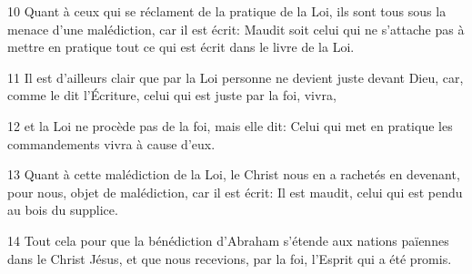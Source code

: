 10 Quant à ceux qui se réclament de la pratique de la Loi, ils sont tous sous la menace d’une malédiction, car il est écrit: Maudit soit celui qui ne s’attache pas à mettre en pratique tout ce qui est écrit dans le livre de la Loi.

11 Il est d’ailleurs clair que par la Loi personne ne devient juste devant Dieu, car, comme le dit l’Écriture, celui qui est juste par la foi, vivra,

12 et la Loi ne procède pas de la foi, mais elle dit: Celui qui met en pratique les commandements vivra à cause d’eux.

13 Quant à cette malédiction de la Loi, le Christ nous en a rachetés en devenant, pour nous, objet de malédiction, car il est écrit: Il est maudit, celui qui est pendu au bois du supplice.

14 Tout cela pour que la bénédiction d’Abraham s’étende aux nations païennes dans le Christ Jésus, et que nous recevions, par la foi, l’Esprit qui a été promis.